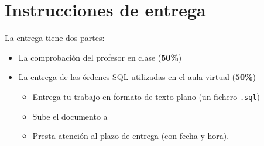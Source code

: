 \section{Instrucciones de entrega}

La entrega tiene dos partes:
\begin{itemize}
\item La comprobación del profesor en clase (\textbf{50\%})
\item La entrega de las órdenes SQL utilizadas en el aula virtual (\textbf{50\%})
  \begin{itemize}
  \item Entrega tu trabajo en formato de texto plano (un fichero \texttt{.sql})
  \item Sube el documento a 
  \item Presta atención al plazo de entrega (con fecha y hora).
  \end{itemize}
\end{itemize}


